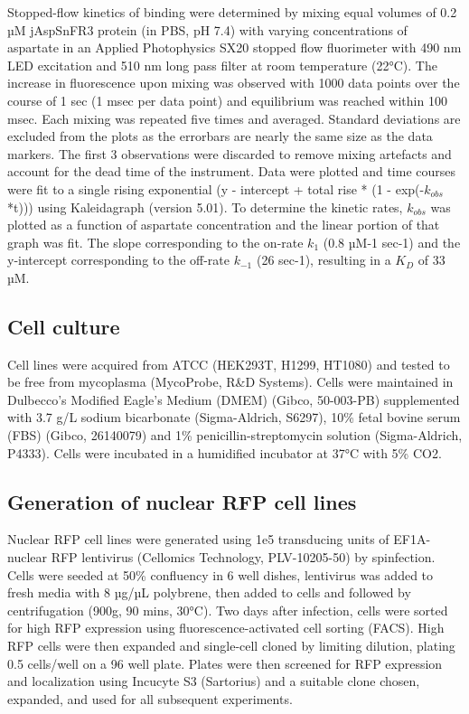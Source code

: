 \documentclass[9pt,lineno]{elife}
\begin{document}
Stopped-flow kinetics of binding were determined by mixing equal volumes of 0.2 µM jAspSnFR3 protein (in PBS, pH 7.4) with varying concentrations of aspartate in an Applied Photophysics SX20 stopped flow fluorimeter with 490 nm LED excitation and 510 nm long pass filter at room temperature (22°C).
The increase in fluorescence upon mixing was observed with 1000 data points over the course of 1 sec (1 msec per data point) and equilibrium was reached within 100 msec.
Each mixing was repeated five times and averaged.
Standard deviations are excluded from the plots as the errorbars are nearly the same size as the data markers.
The first 3 observations were discarded to remove mixing artefacts and account for the dead time of the instrument.
Data were plotted and time courses were fit to a single rising exponential (y - intercept + total rise * (1 - exp(-$k_{obs}$*t))) using Kaleidagraph (version 5.01).
To determine the kinetic rates, $k_{obs}$ was plotted as a function of aspartate concentration and the linear portion of that graph was fit.
The slope corresponding to the on-rate $k_1$ (0.8 µM-1 sec-1) and the y-intercept corresponding to the off-rate $k_{-1}$ (26 sec-1), resulting in a $K_D$ of 33 µM.


\subsection{Cell culture}
Cell lines were acquired from ATCC (HEK293T, H1299, HT1080) and tested to be free from mycoplasma (MycoProbe, R\&D Systems).
Cells were maintained in Dulbecco’s Modified Eagle’s Medium (DMEM) (Gibco, 50-003-PB) supplemented with 3.7 g/L sodium bicarbonate (Sigma-Aldrich, S6297), 10\% fetal bovine serum (FBS) (Gibco, 26140079) and 1\% penicillin-streptomycin solution (Sigma-Aldrich, P4333).
Cells were incubated in a humidified incubator at 37°C with 5\% CO2.

\subsection{Generation of nuclear RFP cell lines}
Nuclear RFP cell lines were generated using 1e5 transducing units of EF1A-nuclear RFP lentivirus (Cellomics Technology, PLV-10205-50) by spinfection.
Cells were seeded at 50\% confluency in 6 well dishes, lentivirus was added to fresh media with 8 µg/µL polybrene, then added to cells and followed by centrifugation (900g, 90 mins, 30°C).
Two days after infection, cells were sorted for high RFP expression using fluorescence-activated cell sorting (FACS).
High RFP cells were then expanded and single-cell cloned by limiting dilution, plating 0.5 cells/well on a 96 well plate.
Plates were then screened for RFP expression and localization using Incucyte S3 (Sartorius) and a suitable clone chosen, expanded, and used for all subsequent experiments.
\end{document}
